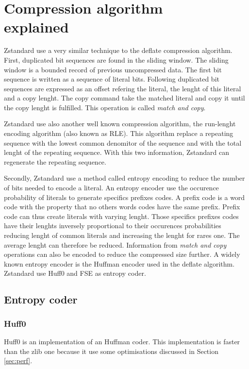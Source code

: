 \documentclass{sig-alternate-05-2015}
\begin{document}
\section{Compression algorithm \\ explained}
    Zstandard use a very similar technique to the deflate compression algorithm. First, duplicated
    bit sequences are found in the sliding window. The sliding window is a bounded record of
    previous uncompressed data.  The first bit sequence is written as a sequence of literal bits.
    Following duplicated bit sequences are expressed as an offset refering the literal, the
    lenght of this literal and a copy lenght. The copy command take the matched
    literal and copy it until the copy lenght is fulfilled. This operation is called \textit{match
    and copy}.

    Zstandard use also another well known compression algorithm, the run-lenght encoding algorithm
    (also known as RLE). This algorithm replace a repeating sequence with the lowest common
    denomitor of the sequence and with the total lenght of the repeating sequence. With this two
    information, Zstandard can regenerate the repeating sequence.

    Secondly, Zstandard use a method called entropy encoding to reduce the number of bits needed to
    encode a literal. An entropy encoder use the occurence probability of literals to generate
    specifics prefixes codes. A prefix code is a word code with the property that no others words
    codes have the same prefix. Prefix code can thus create literals with varying lenght. Those
    specifics prefixes codes have their lenghts inversely proportional to their occurences
    probabilities reducing lenght of common literals and increasing the lenght for rares one. The
    average lenght can therefore be reduced. Information from \textit{match and copy} operations can
    also be encoded to reduce the compressed size further. A widely known entropy encoder is the
    Huffman encoder used in the deflate algorithm. Zstandard use Huff0 and FSE as entropy coder.

    \subsection{Entropy coder}
    \subsubsection{Huff0}
        Huff0 is an implementation of an Huffman coder. This implementation is faster than the
        zlib one because it use some optimisations discussed in Section \ref{sec:perf}.
\end{document}
